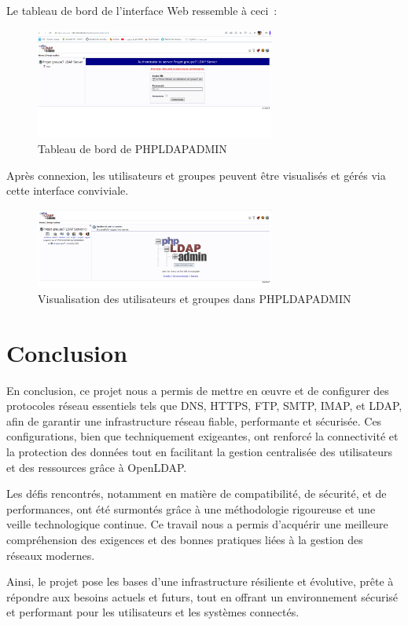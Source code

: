 Le tableau de bord de l'interface Web ressemble à ceci :
\begin{figure}[h]
	\centering
	\includegraphics[width=0.7\textwidth]{LDAP/test1.png}
	\caption{Tableau de bord de PHPLDAPADMIN}
	\label{fig:test1}
\end{figure}

Après connexion, les utilisateurs et groupes peuvent être visualisés et gérés via cette interface conviviale.


\begin{figure}[h!]
	\centering
	\includegraphics[width=0.7\textwidth]{LDAP/test2.png}
	\caption{Visualisation des utilisateurs et groupes dans PHPLDAPADMIN}
	\label{fig:test2}
\end{figure}

		\newpage
\section{Conclusion}

En conclusion, ce projet nous a permis de mettre en œuvre et de configurer des protocoles réseau essentiels tels que DNS, HTTPS, FTP, SMTP, IMAP, et LDAP, afin de garantir une infrastructure réseau fiable, performante et sécurisée. Ces configurations, bien que techniquement exigeantes, ont renforcé la connectivité et la protection des données tout en facilitant la gestion centralisée des utilisateurs et des ressources grâce à OpenLDAP.

Les défis rencontrés, notamment en matière de compatibilité, de sécurité, et de performances, ont été surmontés grâce à une méthodologie rigoureuse et une veille technologique continue. Ce travail nous a permis d'acquérir une meilleure compréhension des exigences et des bonnes pratiques liées à la gestion des réseaux modernes.

Ainsi, le projet pose les bases d’une infrastructure résiliente et évolutive, prête à répondre aux besoins actuels et futurs, tout en offrant un environnement sécurisé et performant pour les utilisateurs et les systèmes connectés.  







